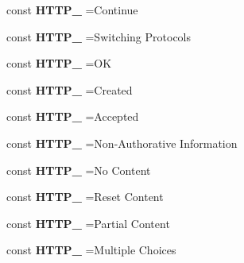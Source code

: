 {\bf }\par
\begin{DoxyCompactItemize}
\item 
\hypertarget{class_base_a42c03aab8b513fd2992aeb7820003ad1}{}\label{class_base_a42c03aab8b513fd2992aeb7820003ad1} 
const {\bfseries H\+T\+T\+P\+\_} =\textquotesingle{}Continue\textquotesingle{}
\item 
\hypertarget{class_base_a3e91894cd6ca5dcd2cdbc4e658328dbe}{}\label{class_base_a3e91894cd6ca5dcd2cdbc4e658328dbe} 
const {\bfseries H\+T\+T\+P\+\_} =\textquotesingle{}Switching Protocols\textquotesingle{}
\item 
\hypertarget{class_base_ae0a2cfd13da12e121cd5cd44cdba63f1}{}\label{class_base_ae0a2cfd13da12e121cd5cd44cdba63f1} 
const {\bfseries H\+T\+T\+P\+\_} =\textquotesingle{}OK\textquotesingle{}
\item 
\hypertarget{class_base_a5a183af6b7b3d27eadc14a92cc1a8f52}{}\label{class_base_a5a183af6b7b3d27eadc14a92cc1a8f52} 
const {\bfseries H\+T\+T\+P\+\_} =\textquotesingle{}Created\textquotesingle{}
\item 
\hypertarget{class_base_a58dd15c950afe66a5723a02d296e8ef3}{}\label{class_base_a58dd15c950afe66a5723a02d296e8ef3} 
const {\bfseries H\+T\+T\+P\+\_} =\textquotesingle{}Accepted\textquotesingle{}
\item 
\hypertarget{class_base_a6829270d25c830b55a9399c8c2f4c64d}{}\label{class_base_a6829270d25c830b55a9399c8c2f4c64d} 
const {\bfseries H\+T\+T\+P\+\_} =\textquotesingle{}Non-\/Authorative Information\textquotesingle{}
\item 
\hypertarget{class_base_afe27bd4b405e5b231f7391a6ad27305d}{}\label{class_base_afe27bd4b405e5b231f7391a6ad27305d} 
const {\bfseries H\+T\+T\+P\+\_} =\textquotesingle{}No Content\textquotesingle{}
\item 
\hypertarget{class_base_a6abfa0503972e8adc8901aac33e3ba82}{}\label{class_base_a6abfa0503972e8adc8901aac33e3ba82} 
const {\bfseries H\+T\+T\+P\+\_} =\textquotesingle{}Reset Content\textquotesingle{}
\item 
\hypertarget{class_base_a58e0f63fd99ed0ea3e7e60d6ad3b945a}{}\label{class_base_a58e0f63fd99ed0ea3e7e60d6ad3b945a} 
const {\bfseries H\+T\+T\+P\+\_} =\textquotesingle{}Partial Content\textquotesingle{}
\item 
\hypertarget{class_base_adafda22dbd720503d24641dd6233d288}{}\label{class_base_adafda22dbd720503d24641dd6233d288} 
const {\bfseries H\+T\+T\+P\+\_} =\textquotesingle{}Multiple Choices\textquotesingle{}

\end{DoxyCompactItemize}
